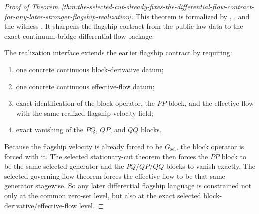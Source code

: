 \begin{proof}[Proof of Theorem~\ref{thm:the-selected-cut-already-fixes-the-differential-flow-contract-for-any-later-stronger-flagship-realization}]
\label{proof:thm:the-selected-cut-already-fixes-the-differential-flow-contract-for-any-later-stronger-flagship-realization}
This theorem is formalized by
,
, and the
witness
.
It sharpens the flagship contract from the public law data to the exact
continuum-bridge differential-flow package.

The realization interface extends the earlier flagship contract by requiring:
\begin{enumerate}
\item one concrete continuous block-derivative datum;
\item one concrete continuous effective-flow datum;
\item exact identification of the block operator, the \(PP\) block, and the
      effective flow with the same realized flagship velocity field;
\item exact vanishing of the \(PQ\), \(QP\), and \(QQ\) blocks.
\end{enumerate}
Because the flagship velocity is already forced to be \(G_{\mathrm{sel}}\),
the block operator is forced with it. The selected stationary-cut theorem then
forces the \(PP\) block to be the same selected generator and the
\(PQ/QP/QQ\) blocks to vanish exactly. The selected governing-flow theorem
forces the effective flow to be that same generator stagewise. So any later
differential flagship language is constrained not only at the common zero-set
level, but also at the exact selected block-derivative/effective-flow level.
\end{proof}

